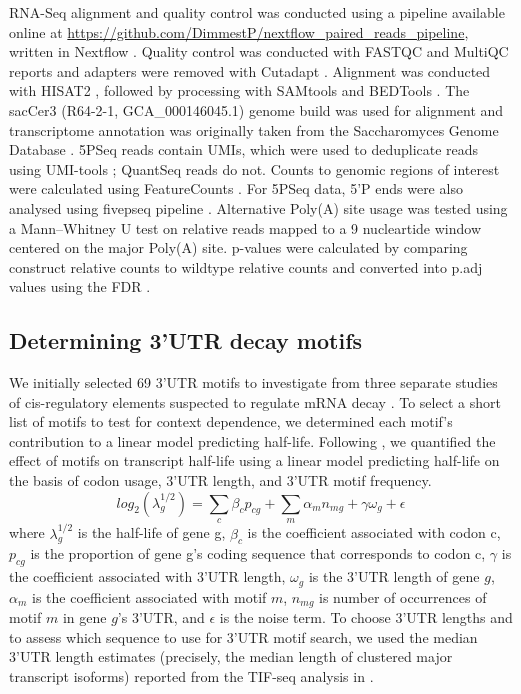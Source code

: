 \documentclass[../main.tex]{subfiles}
\begin{document}
RNA-Seq alignment and quality control was conducted using a pipeline available online at \url{https://github.com/DimmestP/nextflow_paired_reads_pipeline}, written in Nextflow \parencite{DiTommaso2017}.
Quality control was conducted with FASTQC and MultiQC reports \parencite{Ewels2016} and adapters were removed with Cutadapt \parencite{Martin2011}.
Alignment was conducted with HISAT2 \parencite{Kim2019}, followed by processing with SAMtools \parencite{Li2009} and BEDTools \parencite{Quinlan2010}.
The sacCer3 (R64-2-1, GCA\_000146045.1) genome build was used for alignment and transcriptome annotation was originally taken from the Saccharomyces Genome Database \parencite{Ng2020}.
5PSeq reads contain UMIs, which were used to deduplicate reads using UMI-tools \parencite{Smith2017}; QuantSeq reads do not.
Counts to genomic regions of interest were calculated using FeatureCounts \parencite{Liao2014}.
For 5PSeq data, 5'P ends were also analysed using fivepseq pipeline \cite{Nersisyan2020}.
Alternative Poly(A) site usage was tested using a Mann–Whitney U test \parencite{Mann1947} on relative reads mapped to a 9 nucleartide window centered on the major Poly(A) site.
p-values were calculated by comparing construct relative counts to wildtype relative counts and converted into p.adj values using the FDR \parencite{Benjamini1995}.


\subsection{Determining 3'UTR decay motifs}

We initially selected 69 3'UTR motifs to investigate from three separate studies of cis-regulatory elements suspected to regulate mRNA decay \parencite{Hogan2008, Shalgi2005, Cheng2017}.
To select a short list of motifs to test for context dependence, we determined each motif's contribution to a linear model predicting half-life.
Following \parencite{Cheng2017}, we quantified the effect of motifs on transcript half-life using a linear model predicting half-life on the basis of codon usage, 3'UTR length, and 3'UTR motif frequency.
\[log_2(\lambda_g^{1/2}) = \sum_c\beta_cp_{cg} + \sum_m\alpha_mn_{mg} + \gamma \omega_g + \epsilon\]
where \(\lambda_g^{1/2}\) is the half-life of gene g, \(\beta_c\) is the coefficient associated with codon c, \(p_{cg}\) is the proportion of gene g's coding sequence that corresponds to codon c, \(\gamma\) is the coefficient associated with 3'UTR length, \(\omega_g\) is the 3'UTR length of gene \(g\), \(\alpha_m\) is the coefficient associated with motif \(m\), \(n_{mg}\) is number of occurrences of motif \(m\) in gene \(g\)'s 3'UTR, and \(\epsilon\) is the noise term.
To choose 3'UTR lengths and to assess which sequence to use for 3'UTR motif search, we used the median 3'UTR length estimates (precisely, the median length of clustered major transcript isoforms) reported from the TIF-seq analysis in \parencite{Pelechano2013}.
\end{document}

